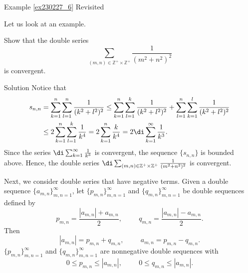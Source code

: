 \begin{example}{\linkt Example \ref{ex230227_6} Revisited}
\begin{example}[label=ex230227_13]{}
\begin{example}{}
Let us look at an example.
\begin{example}{}
Show that the double series
\[\sum_{(m,n)\in\mathbb{Z}^+\times\mathbb{Z}^+}\frac{1}{(m^2+n^2)^2}\] is convergent.
\end{example}
\begin{solution}{Solution}
Notice that 
\begin{align*}
s_{n,n}&=\sum_{k=1}^n\sum_{l=1}^n\frac{1}{(k^2+l^2)^2} \leq  \sum_{k=1}^n\sum_{l=1}^k \frac{1}{(k^2+l^2)^2}+\sum_{l=1}^n\sum_{k=1}^l \frac{1}{(k^2+l^2)^2}\\&
\leq 2\sum_{k=1}^n \sum_{l=1}^k\frac{1}{k^4} 
=2\sum_{k=1}^n\frac{k}{k^4}= 2\di\sum_{k=1}^{\infty}\frac{1}{k^3}.
\end{align*}Since the series $\di\sum_{k=1}^{\infty}\frac{1}{k^3}$ is convergent,     the sequence $\{s_{n,n}\}$ is bounded above. Hence,   the double series $\di\sum_{(m,n)\in\mathbb{Z}^+\times\mathbb{Z}^+}\frac{1}{(m^2+n^2)^2}$ is convergent.
\end{solution}



Next, we consider double series that have negative terms. 
Given a double sequence $\{a_{m,n}\}_{m,n=1}^{\infty}$, let $\{p_{m,n}\}_{m,n=1}^{\infty}$ and $\{q_{m,n}\}_{m,n=1}^{\infty}$ be double sequences defined by
\[p_{m,n}=\frac{|a_{m,n}|+a_{m,n}}{2},\hspace{1cm}q_{m,n}=\frac{|a_{m,n}|-a_{m,n}}{2}.\]Then
\[|a_{m,n}|=p_{m,n}+q_{m,n},\hspace{1cm}a_{m,n}=p_{m,n}-q_{m,n}.\]
 $\{p_{m,n}\}_{m,n=1}^{\infty}$ and $\{q_{m,n}\}_{m,n=1}^{\infty}$ are nonnegative double sequences with
\[0\leq p_{m,n}\leq |a_{m,n}|,\hspace{1cm}0\leq q_{m,n}\leq |a_{m,n}|.\]

 


\end{example}
\end{example}
\end{example}
